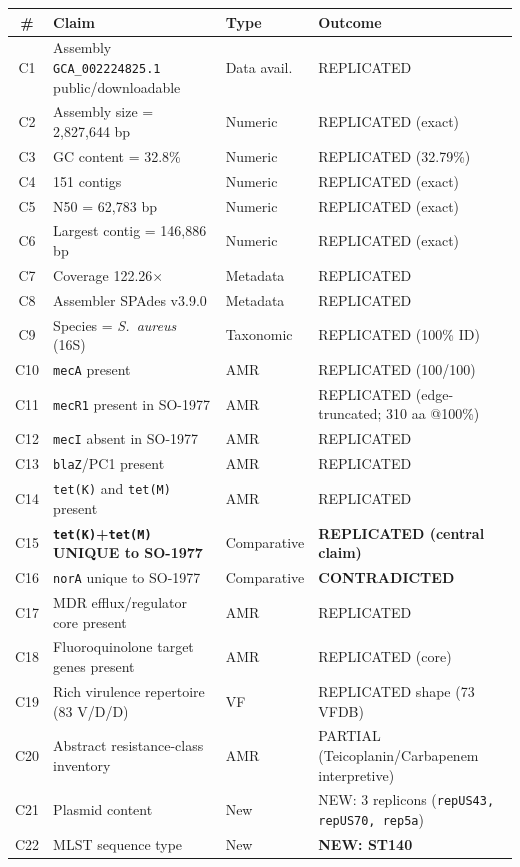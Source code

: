 \documentclass[11pt]{article}
\begin{document}
\begin{longtable}{@{}clll@{}}
\toprule
\# & Claim & Type & Outcome \\ \midrule
C1  & Assembly \texttt{GCA\_002224825.1} public/downloadable & Data avail. & REPLICATED \\
C2  & Assembly size = 2{,}827{,}644 bp & Numeric & REPLICATED (exact) \\
C3  & GC content = 32.8\% & Numeric & REPLICATED (32.79\%) \\
C4  & 151 contigs & Numeric & REPLICATED (exact) \\
C5  & N50 = 62{,}783 bp & Numeric & REPLICATED (exact) \\
C6  & Largest contig = 146{,}886 bp & Numeric & REPLICATED (exact) \\
C7  & Coverage 122.26$\times$ & Metadata & REPLICATED \\
C8  & Assembler SPAdes v3.9.0 & Metadata & REPLICATED \\
C9  & Species = \emph{S.\ aureus} (16S) & Taxonomic & REPLICATED (100\% ID) \\
C10 & \texttt{mecA} present & AMR & REPLICATED (100/100) \\
C11 & \texttt{mecR1} present in SO-1977 & AMR & REPLICATED (edge-truncated; 310 aa @100\%) \\
C12 & \texttt{mecI} absent in SO-1977 & AMR & REPLICATED \\
C13 & \texttt{blaZ}/PC1 present & AMR & REPLICATED \\
C14 & \texttt{tet(K)} and \texttt{tet(M)} present & AMR & REPLICATED \\
C15 & \textbf{\texttt{tet(K)}+\texttt{tet(M)} UNIQUE to SO-1977} & Comparative & \textbf{REPLICATED (central claim)} \\
C16 & \texttt{norA} unique to SO-1977 & Comparative & \textbf{CONTRADICTED} \\
C17 & MDR efflux/regulator core present & AMR & REPLICATED \\
C18 & Fluoroquinolone target genes present & AMR & REPLICATED (core) \\
C19 & Rich virulence repertoire (83 V/D/D) & VF & REPLICATED shape (73 VFDB) \\
C20 & Abstract resistance-class inventory & AMR & PARTIAL (Teicoplanin/Carbapenem interpretive) \\
C21 & Plasmid content & New & NEW: 3 replicons (\texttt{repUS43, repUS70, rep5a}) \\
C22 & MLST sequence type & New & \textbf{NEW: ST140} \\ \bottomrule
\end{longtable}
\end{document}
